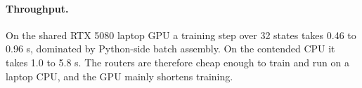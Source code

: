 \paragraph{Throughput.} On the shared RTX 5080 laptop GPU a training step over 32 states takes 0.46 to 0.96 s,
dominated by Python-side batch assembly. On the contended CPU it takes 1.0 to 5.8 s. The routers are therefore cheap
enough to train and run on a laptop CPU, and the GPU mainly shortens training.

